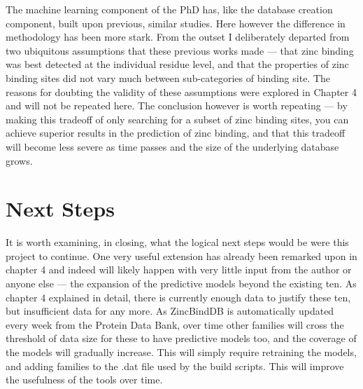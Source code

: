 The machine learning component of the PhD has, like the database creation component, built upon previous, similar studies. Here however the difference in methodology has been more stark. From the outset I deliberately departed from two ubiquitous assumptions that these previous works made --- that zinc binding was best detected at the individual residue level, and that the properties of zinc binding sites did not vary much between sub-categories of binding site. The reasons for doubting the validity of these assumptions were explored in Chapter 4 and will not be repeated here. The conclusion however is worth repeating --- by making this tradeoff of only searching for a subset of zinc binding sites, you can achieve superior results in the prediction of zinc binding, and that this tradeoff will become less severe as time passes and the size of the underlying database grows.

\section{Next Steps}

It is worth examining, in closing, what the logical next steps would be were this project to continue. One very useful extension has already been remarked upon in chapter 4 and indeed will likely happen with very little input from the author or anyone else --- the expansion of the predictive models beyond the existing ten. As chapter 4 explained in detail, there is currently enough data to justify these ten, but insufficient data for any more. As ZincBindDB is automatically updated every week from the Protein Data Bank, over time other families will cross the threshold of data size for these to have predictive models too, and the coverage of the models will gradually increase. This will simply require retraining the models, and adding families to the .dat file used by the build scripts. This will improve the usefulness of the tools over time.

